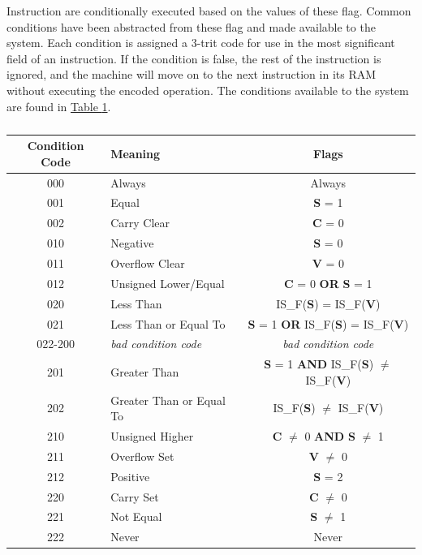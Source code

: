 \documentclass[12pt]{article}
\begin{document}
Instruction are conditionally executed based on the values of these flag. Common conditions have been abstracted from these flag and made available to the system. Each condition is assigned a 3-trit code for use in the most significant field of an instruction. If the condition is false, the rest of the instruction is ignored, and the machine will move on to the next instruction in its RAM without executing the encoded operation. The conditions available to the system are found in \hyperref[tab:Conditions]{Table \ref{tab:Conditions}}.

\begin{table}[h!]
    \centering
    \caption{}
    \label{tab:Conditions}
    \begin{tabular}{|c|l|c|} 
        \hline
        \textbf{Condition Code} & Meaning & Flags \\ \hline
        
        000 & Always & Always \\ \hline
        001 & Equal & \textbf{S} = 1 \\ \hline
        002 & Carry Clear & \textbf{C} = 0 \\ \hline
        010 & Negative & \textbf{S} = 0 \\ \hline
        011 & Overflow Clear & \textbf{V} = 0 \\ \hline
        012 & Unsigned Lower/Equal & \textbf{C} = 0 \textbf{OR} \textbf{S} = 1 \\ \hline
        020 & Less Than & IS\_F(\textbf{S}) = IS\_F(\textbf{V}) \\ \hline
        021 & Less Than or Equal To & \textbf{S} = 1 \textbf{OR} IS\_F(\textbf{S}) = IS\_F(\textbf{V}) \\ \hline
    
        022-200 & \textit{bad condition code} & \textit{bad condition code} \\ \hline
    
        201 & Greater Than & \textbf{S} = 1 \textbf{AND} IS\_F(\textbf{S}) $\neq$ IS\_F(\textbf{V}) \\ \hline
        202 & Greater Than or Equal To & IS\_F(\textbf{S}) $\neq$ IS\_F(\textbf{V}) \\ \hline
        210 & Unsigned Higher & \textbf{C} $\neq$ 0 \textbf{AND} \textbf{S} $\neq$ 1 \\ \hline
        211 & Overflow Set & \textbf{V} $\neq$ 0 \\ \hline
        212 & Positive & \textbf{S} = 2 \\ \hline
        220 & Carry Set & \textbf{C} $\neq$ 0 \\ \hline
        221 & Not Equal & \textbf{S} $\neq$ 1 \\ \hline
        222 & Never & Never \\ \hline
    \end{tabular}
\end{table}
\end{document}
